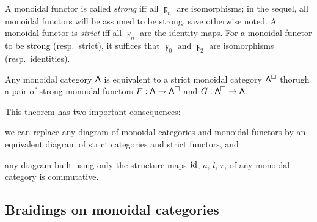 A monoidal functor is called \emph{strong} iff all $\digamma_n$ are
isomorphisms; in the sequel, all monoidal functors will be assumed to
be strong, save otherwise noted. A monoidal functor is \emph{strict}
iff all $\digamma_n$ are the identity maps. For a monoidal functor to be
strong (resp.\ strict), it suffices that $\digamma_0$ and $\digamma_2$ are
isomorphisms (resp.\ identities).

\begin{theorem*}
  Any monoidal category $\mathsf{A}$ is equivalent to a strict monoidal
  category $\mathsf{A}^\Box$ thorugh a pair of strong monoidal functors $F: \mathsf{A}
  \to \mathsf{A}^\Box$ and $G: \mathsf{A}^\Box \to \mathsf{A}$.  
\end{theorem*}
This theorem has two important consequences:
\begin{inparaenum}
  we can replace any diagram of monoidal categories and monoidal
  functors by an equivalent diagram of strict categories and strict
  functors, and 
\item any diagram built using only the structure maps $\operatorname{id}$, $a$, $l$,
  $r$, of any monoidal category is commutative.
\end{inparaenum}


\subsection{Braidings on monoidal categories}
\label{sec:braidings}

